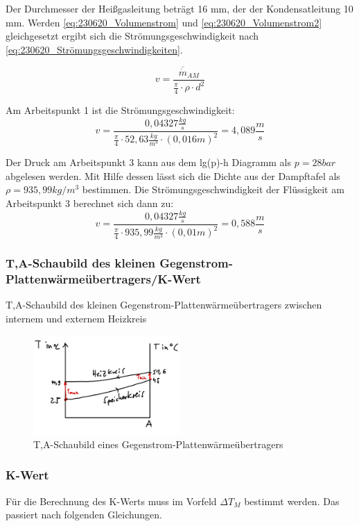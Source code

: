 Der Durchmesser der Heißgasleitung beträgt 16 mm, der der Kondensatleitung 10
mm.
Werden \autoref{eq:230620_Volumenstrom} und \autoref{eq:230620_Volumenstrom2} gleichgesetzt ergibt sich die Strömungsgeschwindigkeit nach \autoref{eq:230620_Strömungsgeschwindigkeiten}.

\begin{equation}
    v = \frac{\overline{\dot m}_{AM}}{\frac{\pi}{4}\cdot \rho \cdot d^2}
    \label{eq:230620_Strömungsgeschwindigkeiten}
\end{equation}

Am Arbeitspunkt 1 ist die Strömungsgeschwindigkeit:
$$v=\frac{0,04327 \frac{kg}{s}}{\frac{\pi}{4}\cdot 52,63 \frac{kg}{m^3} \cdot (0,016 m)^2}=4,089 \frac{m}{s} $$

Der Druck am Arbeitspunkt 3 kann aus dem lg(p)-h Diagramm als $p=28 bar$ abgelesen werden. Mit Hilfe dessen lässt sich die Dichte aus der Dampftafel als $\rho=935,99 kg/m^3$ bestimmen.
Die Strömungsgeschwindigkeit der Flüssigkeit am Arbeitspunkt 3 berechnet sich dann zu:
$$v=\frac{0,04327 \frac{kg}{s}}{\frac{\pi}{4}\cdot 935,99\frac{kg}{m^3} \cdot (0,01 m)^2}=0,588 \frac{m}{s}$$

\subsubsection{T,A-Schaubild des kleinen Gegenstrom-Plattenwärmeübertragers/K-Wert}

T,A-Schaubild des kleinen Gegenstrom-Plattenwärmeübertragers
zwischen internem und externem Heizkreis

\begin{figure}[!ht]
    \centering
    \includegraphics[width=0.5\textwidth]{Abbildungen/TA.Diagramm.jpeg}
    \caption{T,A-Schaubild eines Gegenstrom-Plattenwärmeübertragers}
    \label{fig:TA,Diagramm}
\end{figure}

\subsubsection*{K-Wert}
Für die Berechnung des K-Werts muss im Vorfeld $\Delta T_M$ bestimmt werden. Das passiert nach folgenden Gleichungen.

